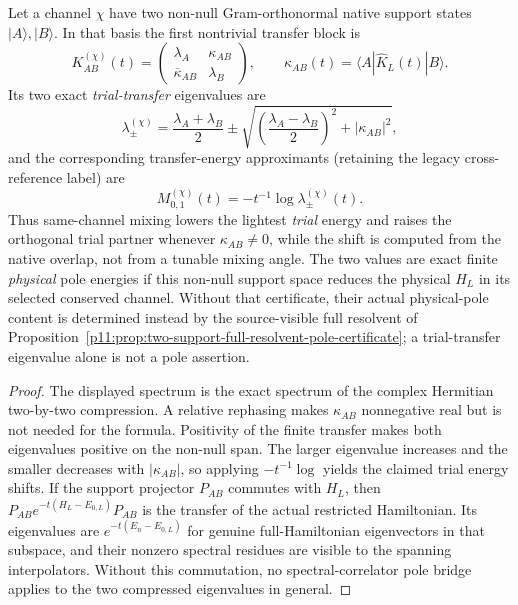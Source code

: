 \documentclass[12pt,a4paper]{article}
\begin{document}
\begin{corollary}
\label{p11:cor:first-two-support-pole-extraction}
Let a channel \(\chi\) have two non-null Gram-orthonormal native support states
\(|A\rangle,|B\rangle\).  In that basis the first nontrivial transfer block is
\begin{equation}
\label{p11:eq:first-two-support-transfer-block}
K^{(\chi)}_{AB}(t)=\begin{pmatrix}
\lambda_A&\kappa_{AB}\\
\overline{\kappa}_{AB}&\lambda_B
\end{pmatrix},
\qquad
\kappa_{AB}(t)=\langle A|\widehat K_L(t)|B\rangle .
\end{equation}
Its two exact \emph{trial-transfer} eigenvalues are
\begin{equation}
\label{p11:eq:first-two-support-eigenvalues}
\lambda_{\pm}^{(\chi)}
=\frac{\lambda_A+\lambda_B}{2}
\pm
\sqrt{\left(\frac{\lambda_A-\lambda_B}{2}\right)^2+
|\kappa_{AB}|^2},
\end{equation}
and the corresponding transfer-energy approximants (retaining the legacy
cross-reference label) are
\begin{equation}
\label{p11:eq:first-two-support-pole-masses}
M_{0,1}^{(\chi)}(t)=-t^{-1}\log\lambda_{\pm}^{(\chi)}(t) .
\end{equation}
Thus same-channel mixing lowers the lightest \emph{trial} energy and raises the
orthogonal trial partner whenever \(\kappa_{AB}\ne0\), while the shift is
computed from the native overlap, not from a tunable mixing angle.  The two
values are exact finite \emph{physical} pole energies if this non-null
support space reduces the physical \(H_L\) in its selected conserved
channel.  Without that certificate, their actual physical-pole content is
determined instead by the source-visible full resolvent of
Proposition~\ref{p11:prop:two-support-full-resolvent-pole-certificate};
a trial-transfer eigenvalue alone is not a pole assertion.
\end{corollary}
\begin{proof}
The displayed spectrum is the exact spectrum of the complex Hermitian
two-by-two compression.  A relative rephasing makes \(\kappa_{AB}\)
nonnegative real but is not needed for the formula. Positivity of the
finite transfer makes both eigenvalues positive on the non-null span.
The larger eigenvalue increases and the smaller decreases with
\(|\kappa_{AB}|\), so applying \(-t^{-1}\log\) yields the claimed trial
energy shifts. If the support projector \(P_{AB}\) commutes with \(H_L\),
then \(P_{AB}e^{-t(H_L-E_{0,L})}P_{AB}\) is the transfer of the actual
restricted Hamiltonian. Its eigenvalues are \(e^{-t(E_n-E_{0,L})}\)
for genuine full-Hamiltonian eigenvectors in that subspace, and their
nonzero spectral residues are visible to the spanning interpolators.
Without this commutation, no spectral-correlator pole bridge applies to
the two compressed eigenvalues in general.
\end{proof}
\end{document}
